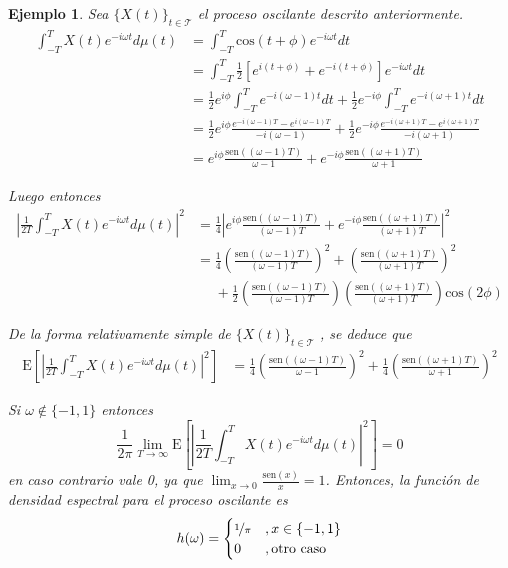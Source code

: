 \documentclass[12pt,letterpaper]{book}
\newtheorem{ejemplo}{Ejemplo}[chapter]
\newcommand{\COS}[1]{\mathrm{cos}\left( #1 \right)}
\newcommand{\SEN}[1]{\mathrm{sen}\left( #1 \right)}
\newcommand{\E}[1]{\mathrm{E}\left[ #1 \right]}
\newcommand{\abso}[1]{\left| #1 \right|}
\newcommand{\xt}{$\{X(t)\}_{t\in \mathcal{T}}$ }
\newcommand{\pheq}{\phantom{=}}
\begin{document}
\begin{ejemplo}
Sea \xt el proceso oscilante descrito anteriormente.
\begin{align*}
\int_{-T}^{T} X(t) e^{-i \omega t} d\mu(t)
&= \int_{-T}^{T} \COS{t+\phi} e^{-i \omega t} dt \\
&= \int_{-T}^{T} \frac{1}{2} \left[ e^{i (t + \phi)} + e^{-i (t + \phi)} \right] e^{-i \omega t} dt \\
&= \frac{1}{2} e^{i \phi} \int_{-T}^{T} e^{-i(\omega-1)t} dt + \frac{1}{2} e^{-i \phi} \int_{-T}^{T} e^{-i(\omega+1)t} dt \\
&= \frac{1}{2} e^{i \phi} \frac{e^{-i(\omega-1)T} - e^{i(\omega-1)T}}{-i(\omega-1)} + \frac{1}{2} e^{-i \phi} \frac{e^{-i(\omega+1)T} - e^{i(\omega+1)T}}{-i(\omega+1)} \\
&= e^{i \phi} \frac{\SEN{(\omega-1)T}}{\omega-1} + e^{-i \phi} \frac{\SEN{(\omega+1)T}}{\omega+1}
\end{align*}

Luego entonces
\begin{align*}
\abso{ \frac{1}{2T} \int_{-T}^{T} X(t) e^{-i \omega t} d\mu(t)}^{2} 
&= 
\frac{1}{4}\abso{ e^{i \phi} \frac{\SEN{(\omega-1)T}}{(\omega-1)T} + e^{-i \phi} \frac{\SEN{(\omega+1)T}}{(\omega+1)T} }^2 \\
&=
\frac{1}{4}\left( \frac{\SEN{(\omega-1)T}}{(\omega-1)T} \right)^2 + \left( \frac{\SEN{(\omega+1)T}}{(\omega+1)T} \right)^2 \\
&\pheq + \frac{1}{2} \left( \frac{\SEN{(\omega-1)T}}{(\omega-1)T} \right) \left( \frac{\SEN{(\omega+1)T}}{(\omega+1)T} \right) \COS{2 \phi}
\end{align*}

De la forma relativamente simple de \xt, se deduce que
\begin{align*}
\E{ \abso{ \frac{1}{2T} \int_{-T}^{T} X(t) e^{-i \omega t} d\mu(t)}^{2} }
&=
\frac{1}{4} \left( \frac{\SEN{(\omega-1)T}}{\omega-1} \right)^2 + \frac{1}{4} \left( \frac{\SEN{(\omega+1)T}}{\omega+1} \right)^2 
\end{align*}

Si $\omega \notin \{-1,1\}$ entonces
\begin{equation}
\frac{1}{2\pi} \lim_{T\rightarrow \infty} \E{ \abso{ \frac{1}{2T} \int_{-T}^{T} X(t) e^{-i \omega t} d\mu(t)}^{2} } = 0
\end{equation}
en caso contrario vale 0, ya que $\lim_{x\rightarrow0} \frac{\SEN{x}}{x} = 1$. Entonces, la función de densidad espectral para el proceso oscilante es
\begin{equation}
h(\omega) = \begin{cases}
\nicefrac{1}{\pi} &, x \in \{ -1, 1 \} \\
0 &, \text{otro caso}
\end{cases}
\end{equation}
\end{ejemplo}
\end{document}
